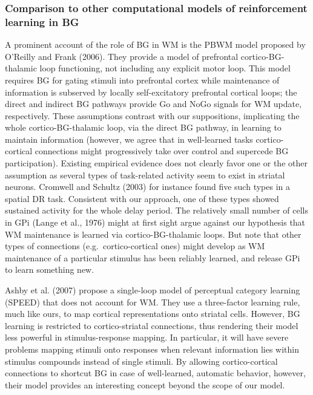 \documentclass[
  11pt,
  a4paper,
]{scrbook}
\begin{document}
\subsubsection*{Comparison to other computational models of
reinforcement learning in
BG}\label{comparison-to-other-computational-models-of-reinforcement-learning-in-bg}

A prominent account of the role of BG in WM is the PBWM model proposed
by O'Reilly and Frank (2006). They provide a model of prefrontal
cortico-BG-thalamic loop functioning, not including any explicit motor
loop. This model requires BG for gating stimuli into prefrontal cortex
while maintenance of information is subserved by locally self-excitatory
prefrontal cortical loops; the direct and indirect BG pathways provide
Go and NoGo signals for WM update, respectively. These assumptions
contrast with our suppositions, implicating the whole
cortico-BG-thalamic loop, via the direct BG pathway, in learning to
maintain information (however, we agree that in well-learned tasks
cortico-cortical connections might progressively take over control and
supercede BG participation). Existing empirical evidence does not
clearly favor one or the other assumption as several types of
task-related activity seem to exist in striatal neurons. Cromwell and
Schultz (2003) for instance found five such types in a spatial DR task.
Consistent with our approach, one of these types showed sustained
activity for the whole delay period. The relatively small number of
cells in GPi (Lange et al., 1976) might at first sight argue against our
hypothesis that WM maintenance is learned via cortico-BG-thalamic loops.
But note that other types of connections (e.g.~cortico-cortical ones)
might develop as WM maintenance of a particular stimulus has been
reliably learned, and release GPi to learn something new.

Ashby et al. (2007) propose a single-loop model of perceptual category
learning (SPEED) that does not account for WM. They use a three-factor
learning rule, much like ours, to map cortical representations onto
striatal cells. However, BG learning is restricted to cortico-striatal
connections, thus rendering their model less powerful in
stimulus-response mapping. In particular, it will have severe problems
mapping stimuli onto responses when relevant information lies within
stimulus compounds instead of single stimuli. By allowing
cortico-cortical connections to shortcut BG in case of well-learned,
automatic behavior, however, their model provides an interesting concept
beyond the scope of our model.
\end{document}
